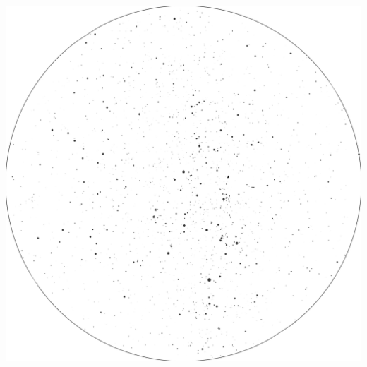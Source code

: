 \documentclass{./SAS-class-skygen}
\begin{document}
	\vspace{0.5cm}
    \begin{center}
    \includegraphics[width=\textwidth]{./pics/skychart32.png}
    \end{center}
    
    
\end{document}
